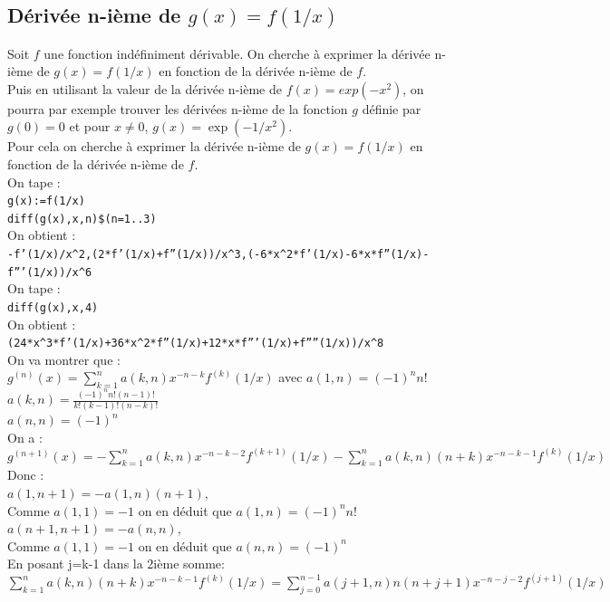 \documentclass[a4paper,11pt]{book}
\begin{document}
\subsection{D\'eriv\'ee n-i\`eme de $g(x)=f(1/x)$}
Soit $f$ une fonction ind\'efiniment d\'erivable.
On cherche \`a exprimer la d\'eriv\'ee n-i\`eme de $g(x)=f(1/x)$ en fonction de la d\'eriv\'ee n-i\`eme de $f$.\\
Puis en utilisant la valeur de la d\'eriv\'ee n-i\`eme de $f(x)=exp(-x^2)$, on 
pourra par exemple trouver les d\'eriv\'ees n-i\`eme de la fonction $g$ d\'efinie par $g(0)=0$ et pour $x\neq 0$, $g(x)=\exp(-1/x^2)$.\\
Pour cela on cherche \`a exprimer la d\'eriv\'ee n-i\`eme de $g(x)=f(1/x)$ en 
fonction de la d\'eriv\'ee n-i\`eme de $f$.\\
On tape :\\
{\tt g(x):=f(1/x)}\\
{\tt diff(g(x),x,n)\$(n=1..3)}\\
On obtient :\\
{\tt -f'(1/x)/x\verb|^|2,(2*f'(1/x)+f''(1/x))/x\verb|^|3,(-6*x\verb|^|2*f'(1/x)-6*x*f''(1/x)-f'''(1/x))/x\verb|^|6}\\
On tape :\\
{\tt diff(g(x),x,4)}\\
On obtient :\\
{\tt (24*x\verb|^|3*f'(1/x)+36*x\verb|^|2*f''(1/x)+12*x*f'''(1/x)+f''''(1/x))/x\verb|^|8}\\
On va montrer que :\\
$g^{(n)}(x)=\sum_{k=1}^na(k,n)x^{-n-k}f^{(k)}(1/x)$
avec 
$a(1,n)=(-1)^nn!$\\
$a(k,n)=\frac{(-1)^nn!(n-1)!}{k!(k-1)!(n-k)!}$\\
$a(n,n)=(-1)^n$\\
On a :\\
$g^{(n+1)}(x)=-\sum_{k=1}^na(k,n)x^{-n-k-2}f^{(k+1)}(1/x)-\sum_{k=1}^na(k,n)(n+k)x^{-n-k-1}f^{(k)}(1/x)$\\
Donc :\\
$a(1,n+1)=-a(1,n)(n+1)$,\\
Comme $a(1,1)=-1$ on en d\'eduit que $a(1,n)=(-1)^nn!$\\
$a(n+1,n+1)=-a(n,n)$,\\
Comme $a(1,1)=-1$ on en d\'eduit que $a(n,n)=(-1)^n$\\
 En  posant j=k-1 dans la 2i\`eme somme:\\
$\sum_{k=1}^na(k,n)(n+k)x^{-n-k-1}f^{(k)}(1/x)=\sum_{j=0}^{n-1}a(j+1,n)n(n+j+1)x^{-n-j-2}f^{(j+1)}(1/x)$\\
\end{document}
